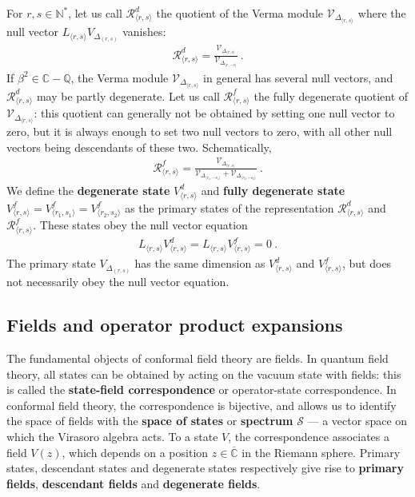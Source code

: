 \documentclass[12pt, a4paper]{article}
\theoremstyle{break}
\begin{document}
For $r,s\in\mathbb{N}^*$, let us call $\mathcal{R}^d_{\langle r,s\rangle}$ the quotient of the Verma module $\mathcal{V}_{\Delta_{\langle r,s\rangle}}$ where the null vector $L_{\langle r,s\rangle}V_{\Delta_{(r,s)}}$ vanishes:
\begin{align}
 \mathcal{R}^d_{\langle r,s\rangle} 
 =\frac{\mathcal{V}_{\Delta_{\langle r,s\rangle}}}{\mathcal{V}_{\Delta_{\langle r,-s\rangle}}}\ . 
 \label{rvv}
\end{align}
If $\beta^2\in \mathbb{C}-\mathbb{Q}$, the Verma module $\mathcal{V}_{\Delta_{\langle r,s\rangle}}$ in general has several null vectors, and $\mathcal{R}^d_{\langle r,s\rangle}$ may be partly degenerate. Let us call $\mathcal{R}^f_{\langle r,s\rangle}$ the fully degenerate quotient of  $\mathcal{V}_{\Delta_{\langle r,s\rangle}}$: this quotient can generally not be obtained by setting one null vector to zero, but it is always enough to set two null vectors to zero, with all other null vectors being descendants of these two. Schematically,
\begin{align}
 \mathcal{R}^f_{\langle r,s\rangle} = \frac{\mathcal{V}_{\Delta_{\langle r,s\rangle}}}{\mathcal{V}_{\Delta_{\langle r_1,-s_1\rangle}}+ \mathcal{V}_{\Delta_{\langle r_2,-s_2\rangle}}}\ .
\end{align}
We define the \textbf{degenerate state} $V^d_{\langle r,s\rangle}$ and \textbf{fully degenerate state} $V^f_{\langle r,s\rangle}=V^f_{\langle r_1,s_1\rangle}=V^f_{\langle r_2,s_2\rangle}$ as the primary states of the representation $\mathcal{R}^d_{\langle r,s\rangle}$ and 
$\mathcal{R}^f_{\langle r,s\rangle}$. These states obey the null vector equation
\begin{align}
L_{\langle r, s\rangle} V^d_{\langle r,s\rangle} = L_{\langle r, s\rangle} V^f_{\langle r,s\rangle} = 0\ .
\end{align}
The primary state $V_{\Delta_{(r,s)}}$ has the same dimension as $V^d_{\langle r,s\rangle}$ and $V^f_{\langle r,s\rangle}$, but does not necessarily obey the null vector equation. 

\subsection{Fields and operator product expansions}\label{sec:fope}

The fundamental objects of conformal field theory are fields. In quantum field theory, all states can be obtained by acting on the vacuum state with fields: this is called the \textbf{state-field correspondence} or operator-state correspondence. In conformal field theory, the correspondence is bijective, and allows us to identify the space of fields with the \textbf{space of states} or \textbf{spectrum} $\mathcal{S}$ --- a vector space on which the Virasoro algebra acts. To a state $V$, the correspondence associates a field $V(z)$, which depends on a position $z\in\overline{\mathbb{C}}$ in the Riemann sphere. Primary states, descendant states and degenerate states respectively give rise to \textbf{primary fields}, \textbf{descendant fields} and \textbf{degenerate fields}.
\end{document}
